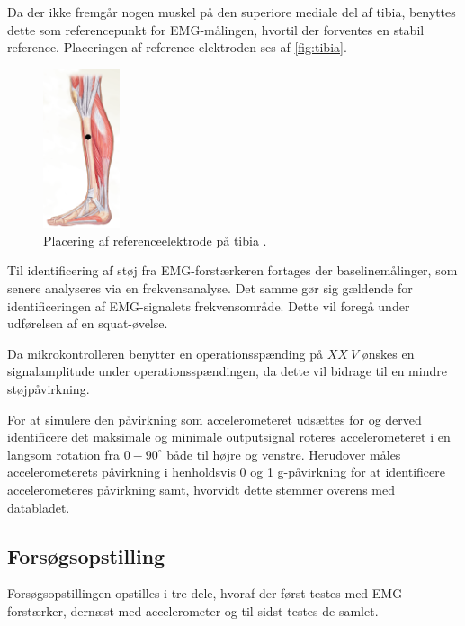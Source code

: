 Da der ikke fremgår nogen muskel på den superiore mediale del af tibia, benyttes dette som referencepunkt for EMG-målingen, hvortil der forventes en stabil reference. Placeringen af reference elektroden ses af \autoref{fig:tibia}.

\begin{figure}[H]
\centering
\includegraphics[width=0.2\textwidth]{figures/tibia.png}
\caption{Placering af referenceelektrode på tibia \citep{martini2012}.}
\label{fig:tibia}
\end{figure}

Til identificering af støj fra EMG-forstærkeren fortages der baselinemålinger, som senere analyseres via en frekvensanalyse. Det samme gør sig gældende for identificeringen af EMG-signalets frekvensområde. Dette vil foregå under udførelsen af en squat-øvelse.  

Da mikrokontrolleren benytter en operationsspænding på $XX~V$ ønskes en signalamplitude under operationsspændingen, da dette vil bidrage til en mindre støjpåvirkning. 

For at simulere den påvirkning som accelerometeret udsættes for og derved identificere det maksimale og minimale outputsignal roteres accelerometeret i en langsom rotation fra $0 - 90^{\circ}$ både til højre og venstre. Herudover måles accelerometerets påvirkning i henholdsvis 0 og 1 g-påvirkning for at identificere accelerometeres påvirkning samt, hvorvidt dette stemmer overens med databladet.


\subsection{Forsøgsopstilling}
Forsøgsopstillingen opstilles i tre dele, hvoraf der først testes med EMG-forstærker, dernæst med accelerometer og til sidst testes de samlet. 

